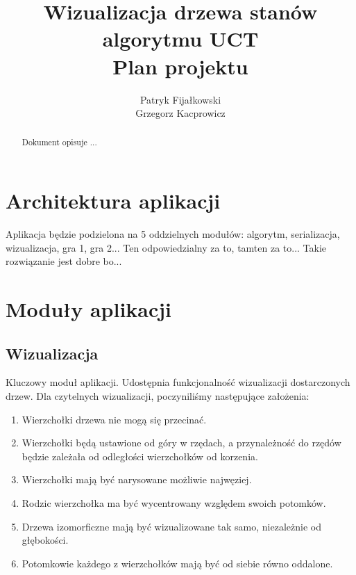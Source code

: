 \documentclass{article}
\title{
	Wizualizacja drzewa stanów algorytmu UCT \\
	\large Plan projektu}
\author{Patryk Fijałkowski \\ Grzegorz Kacprowicz}
\let\oldsection\section
\renewcommand\section{\clearpage\oldsection}
\begin{document}
	\begin{titlingpage}
		\maketitle
		\vspace{3cm}
		\begin{abstract}
			Dokument opisuje ...
		\end{abstract}
	\end{titlingpage}

	\begin{versionhistory}
	\end{versionhistory}
	
	\tableofcontents
	
	\section{Architektura aplikacji}
	Aplikacja będzie podzielona na 5 oddzielnych modułów: algorytm, serializacja, wizualizacja, gra 1, gra 2... Ten odpowiedzialny za to, tamten za to... Takie rozwiązanie jest dobre bo...
	
	
	\section{Moduły aplikacji}
	\subsection{Wizualizacja}
	Kluczowy moduł aplikacji. Udostępnia funkcjonalność wizualizacji dostarczonych drzew. Dla czytelnych wizualizacji, poczyniliśmy następujące założenia: \\
	
	\begin{enumerate}
		\item Wierzchołki drzewa nie mogą się przecinać.
		\item Wierzchołki będą ustawione od góry w rzędach, a przynależność do
		rzędów będzie zależała od odległości wierzchołków od korzenia.
		\item Wierzchołki mają być narysowane możliwie najwęziej. 
		\item Rodzic wierzchołka ma być wycentrowany względem swoich potomków.
		\item Drzewa izomorficzne mają być wizualizowane tak samo, niezależnie od głębokości.
		\item Potomkowie każdego z wierzchołków mają być od siebie równo oddalone. \\
	\end{enumerate}
\end{document}
